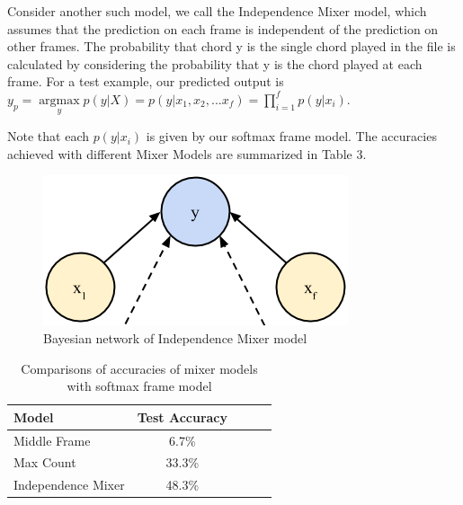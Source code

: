 \documentclass{article}
\begin{document}
Consider another such model, we call the Independence Mixer model, which assumes
that the prediction on each frame is independent of the prediction on other
frames. The probability that chord y is the single chord played in the file is
calculated by considering the probability that y is the chord played at each
frame. For a test example, our predicted output is $y_p =
\underset{y}{\operatorname{argmax}} p(y | X) = p(y | x_1, x_2, ... x_f) =
\prod_{i=1}^fp(y | x_i)$.

Note that each $p(y | x_i)$ is given by our softmax frame model. The accuracies
achieved with different Mixer Models are summarized in Table 3.
\begin{figure}[ht]
\vskip 0.2in
\begin{center}
\centerline{\includegraphics[width=\columnwidth]{naive}}
\caption{Bayesian network of Independence Mixer model}
\label{icml-historical}
\end{center}
\vskip -0.2in
\end{figure}

\begin{table}[t]
\caption{Comparisons of accuracies of mixer models with softmax frame model}
\label{mfccvschroma}
\vskip 0.15in
\begin{center}
\begin{small}
\begin{sc}
\begin{tabular}{lcccr}
\hline
\abovespace\belowspace
Model & Test Accuracy \\
\hline
\abovespace
Middle Frame & 6.7\%\\
Max Count & 33.3\%\\
Independence Mixer & 48.3\%\\
\hline
\end{tabular}
\end{sc}
\end{small}
\end{center}
\vskip -0.1in
\end{table}
\end{document}
